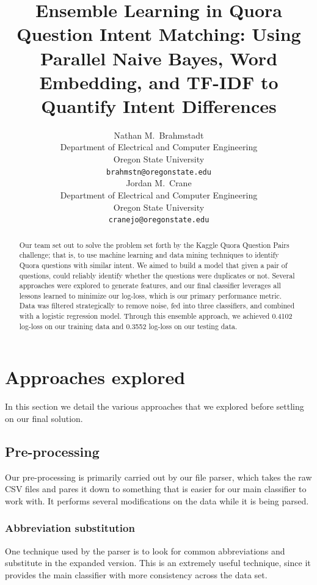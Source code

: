 \documentclass{article}
\title{Ensemble Learning in Quora Question Intent Matching:
Using Parallel Naive Bayes, Word Embedding, and TF-IDF to Quantify Intent Differences}
\author{
    Nathan M.~Brahmstadt \\
  Department of Electrical and Computer Engineering\\
  Oregon State University\\
  \texttt{brahmstn@oregonstate.edu} \\
  \And
  Jordan M.~Crane \\
  Department of Electrical and Computer Engineering \\
  Oregon State University \\
  \texttt{cranejo@oregonstate.edu} \\
}
\begin{document}

\maketitle

\begin{abstract}
    Our team set out to solve the problem set forth by the Kaggle Quora Question
    Pairs challenge; that is, to use machine learning and data mining techniques
    to identify Quora questions with similar intent. We aimed to build a model
    that given a pair of questions, could reliably identify whether the
    questions were duplicates or not. Several approaches were explored to
    generate features, and our final classifier leverages all lessons learned
    to minimize our log-loss, which is our primary performance metric. Data was
    filtered strategically to remove noise, fed into three classifiers,
    and combined with a logistic regression model. Through this ensemble
    approach, we achieved 0.4102 log-loss on our training data and 0.3552
    log-loss on our testing data.
\end{abstract}

\section{Approaches explored}

In this section we detail the various approaches that we explored before
settling on our final solution.

\subsection{Pre-processing}

Our pre-processing is primarily carried out by our file parser, which takes the
raw CSV files and pares it down to something that is easier for our main
classifier to work with. It performs several modifications on the data while it
is being parsed.

\subsubsection{Abbreviation substitution}

One technique used by the parser is to look for common abbreviations and
substitute in the expanded version. This is an extremely useful technique, since
it provides the main classifier with more consistency across the data set.
\end{document}
